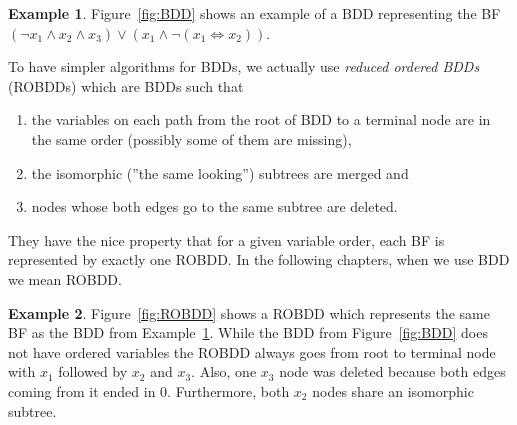 \documentclass[
  digital, %
  color,
  twoside, %
  table,   %
  nolof,     %
  nolot,     %
]{fithesis3}
\theoremstyle{definition}
\newtheorem{example}{Example}
\theoremstyle{remark}
\newcommand{\lequal}{\Leftrightarrow}
\begin{document}
\begin{example}
\label{ex:BDD}
Figure~\ref{fig:BDD} shows an example of a BDD representing the BF $(\neg x_1 \land x_2 \land x_3) \lor (x_1 \land \neg (x_1 \lequal x_2))$. 
\end{example}

To have simpler algorithms for BDDs, we actually use \emph{reduced ordered BDDs} (ROBDDs) which are BDDs such that 
\begin{enumerate}
    \item the variables on each path from the root of BDD to a terminal node are in the same order (possibly some of them are missing),
    \item the isomorphic (''the same looking'') subtrees are merged and
    \item nodes whose both edges go to the same subtree are deleted.
\end{enumerate}
They have the nice property that for a given variable order, each BF is represented by exactly one ROBDD. In the following chapters, when we use BDD we mean ROBDD.

\begin{example}
\label{ex:ROBDD}
Figure~\ref{fig:ROBDD} shows a ROBDD which represents the same BF as the BDD from Example~\ref{ex:BDD}. While the BDD from Figure~\ref{fig:BDD} does not have ordered variables the ROBDD always goes from root to terminal node with $x_1$ followed by $x_2$ and $x_3$. Also, one $x_3$ node was deleted because both edges coming from it ended in $0$. Furthermore, both $x_2$ nodes share an isomorphic subtree.
\end{example}




\end{document}
